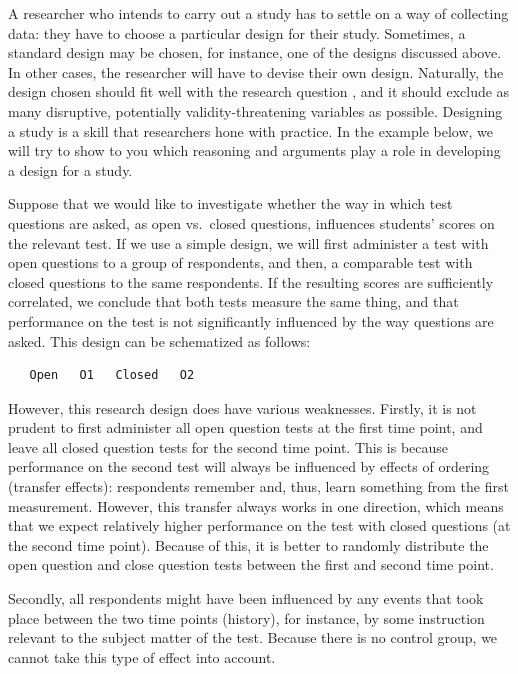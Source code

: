 \documentclass[
]{book}
\begin{document}
A researcher who intends to carry out a study has to settle on a way of collecting data: they have to choose a particular design for their study. Sometimes, a standard design may be chosen, for instance, one of the designs discussed above. In other cases, the researcher will have to devise their own design. Naturally, the design chosen should fit well with the research question \citep{Levin99}, and it should exclude as many disruptive, potentially validity-threatening variables as possible. Designing a study is a skill that researchers hone with practice. In the example below, we will try to show to you which reasoning and arguments play a role in developing a design for a study.

Suppose that we would like to investigate whether the way in which test questions are asked, as open vs.~closed questions, influences students' scores on the relevant test. If we use a simple design, we will first administer a test with open questions to a group of respondents, and then, a comparable test with closed questions to the same respondents. If the resulting scores are sufficiently correlated, we conclude that both tests measure the same thing, and that performance on the test is not significantly influenced by the way questions are asked. This design can be schematized as follows:

\begin{verbatim}
   Open   O1   Closed   O2
\end{verbatim}

However, this research design does have various weaknesses. Firstly, it is not prudent to first administer all open question tests at the first time point, and leave all closed question tests for the second time point. This is because performance on the second test will always be influenced by effects of ordering (transfer effects): respondents remember and, thus, learn something from the first measurement. However, this transfer always works in one direction, which means that we expect relatively higher performance on the test with closed questions (at the second time point). Because of this, it is better to randomly distribute the open question and close question tests between the first and second time point.

Secondly, all respondents might have been influenced by any events that took place between the two time points (history), for instance, by some instruction relevant to the subject matter of the test. Because there is no control group, we cannot take this type of effect into account.
\end{document}
